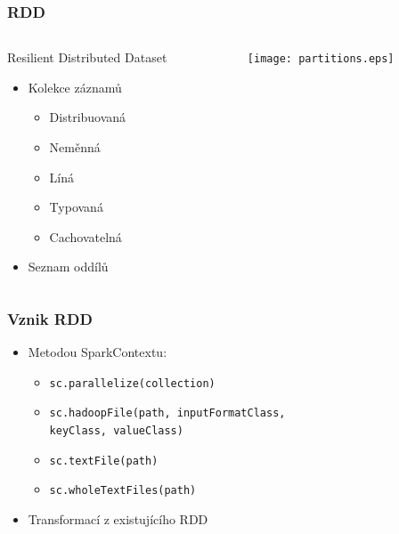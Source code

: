 \documentclass[xcolor=dvipsnames,compact]{beamer}
\newcommand\tab[1][1cm]{\hspace*{#1}}
\begin{document}
\begin{frame}
	\frametitle{RDD}
	\begin{columns}[T] %
		\begin{column}{.48\textwidth}
			Resilient Distributed Dataset 
			\begin{itemize}
				\item Kolekce záznamů
				\begin{itemize}
					\item Distribuovaná
					\item Neměnná
					\item Líná
					\item Typovaná
					\item Cachovatelná
				\end{itemize}
				\item Seznam oddílů
			\end{itemize}
		\end{column}
		\begin{column}{.48\textwidth}
			\begin{figure}
				\begin{center}
					\vskip -1cm
					\texttt{[image: partitions.eps]}
				\end{center}
			\end{figure}
		\end{column}
	\end{columns}
\end{frame}

\begin{frame}[fragile]
	\frametitle{Vznik RDD} 
	\begin{itemize}
		\item Metodou SparkContextu:
		\begin{itemize}
			\item \verb|sc.parallelize(collection)|
			\item \verb|sc.hadoopFile(path, inputFormatClass,| \\
				\tab \verb|keyClass, valueClass)|
			\item \verb|sc.textFile(path)|
			\item \verb|sc.wholeTextFiles(path)|
		\end{itemize}
		\item Transformací z existujícího RDD
	\end{itemize}
\end{frame}
\end{document}
